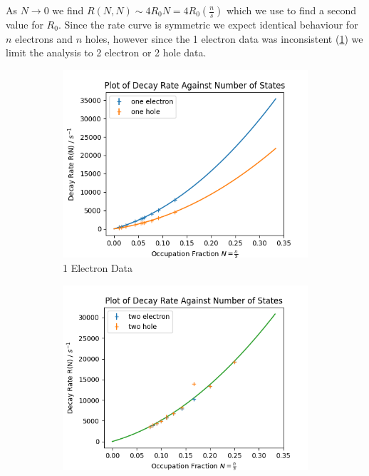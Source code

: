 As \(N\rightarrow{}0\)
we find
\(R(N,N) \sim{} 4 R_0 N = 4R_0 (\frac{n}{s})\)
which we use to
find a second value for \(R_0\).
Since the rate curve
is symmetric we expect
identical behaviour for
\(n\) electrons and
\(n\) holes, however since
the 1 electron
data was inconsistent (\cref{sub@fig:one electron rates})
we limit the analysis to 2 electron
or 2 hole data.
\begin{figure}[htbp]
    \centering
    \begin{subfigure}{0.45\linewidth}
        \centering
        \includegraphics[width =0.9 \linewidth]{Figures/Simulation/Decay rate against occupation n=1.png}
        \caption{1 Electron Data
        }\label{sub@fig:one electron rates}
    \end{subfigure}
    \begin{subfigure}{0.45\linewidth}
        \centering
        \includegraphics[width = 0.9\linewidth]{Figures/Simulation/Decay rate against occupation n=2.png}

\end{subfigure}
\end{figure}
